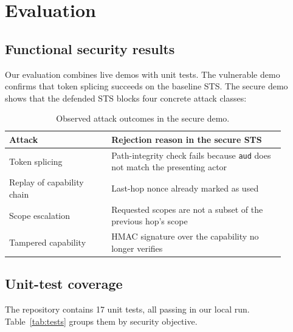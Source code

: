 \documentclass[11pt]{article}
\begin{document}
\section{Evaluation}
\subsection{Functional security results}
Our evaluation combines live demos with unit tests. The vulnerable demo confirms that token splicing succeeds on the baseline STS. The secure demo shows that the defended STS blocks four concrete attack classes:

\begin{table}[htbp]
  \centering
  \begin{tabular}{>{\raggedright\arraybackslash}p{0.33\linewidth} >{\raggedright\arraybackslash}p{0.57\linewidth}}
    \toprule
    Attack & Rejection reason in the secure STS \\
    \midrule
    Token splicing & Path-integrity check fails because \texttt{aud} does not match the presenting actor \\
    Replay of capability chain & Last-hop nonce already marked as used \\
    Scope escalation & Requested scopes are not a subset of the previous hop's scope \\
    Tampered capability & HMAC signature over the capability no longer verifies \\
    \bottomrule
  \end{tabular}
  \caption{Observed attack outcomes in the secure demo.}
  \label{tab:blocked}
\end{table}

\subsection{Unit-test coverage}
The repository contains 17 unit tests, all passing in our local run. Table~\ref{tab:tests} groups them by security objective.
\end{document}
